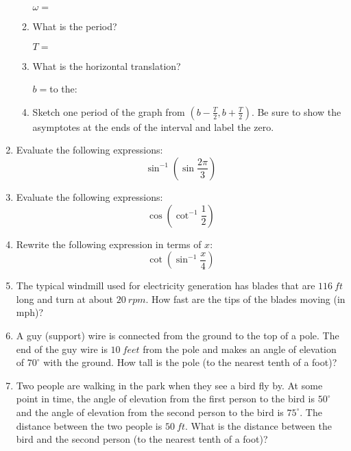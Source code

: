 \documentclass[letterpaper,12pt,fleqn]{article}
\newcommand{\w}{\omega}
\begin{document}
\begin{enumerate}
\begin{enumerate}
    $\w=$

  \item What is the period?

    $T=$
    
  \item What is the horizontal translation?

    $b=$\hspace{1in}to the:
    
  \item Sketch one period of the graph from
    $\left(b-\frac{T}{2},b+\frac{T}{2}\right)$. Be sure to show the asymptotes
    at the ends of the interval and label the zero.

    \vspace{0.25in}

  \end{enumerate}

\item Evaluate the following expressions:
  \[\sin^{-1}\left(\sin\frac{2\pi}{3}\right)\]

\item Evaluate the following expressions:
  \[\cos\left(\cot^{-1}\frac{1}{2}\right)\]

\item Rewrite the following expression in terms of $x$:
  \[\cot\left(\sin^{-1}\frac{x}{4}\right)\]

\item The typical windmill used for electricity generation has blades that are
  $\SI{116}{ft}$ long and turn at about $\SI{20}{rpm}$. How fast are the
  tips of the blades moving (in mph)?

\item A guy (support) wire is connected from the ground to the top of a pole.
  The end of the guy wire is $\SI{10}{feet}$ from the pole and makes an angle
  of elevation of $70^{\circ}$ with the ground.  How tall is the pole (to the
  nearest tenth of a foot)?

\item Two people are walking in the park when they see a bird fly by. At some
  point in time, the angle of elevation from the first person to the bird is
  $50^{\circ}$ and the angle of elevation from the second person to the bird is
  $75^{\circ}$. The distance between the two people is $\SI{50}{ft}$. What is
  the distance between the bird and the second person (to the nearest tenth
  of a foot)?


\end{enumerate}
\end{document}
